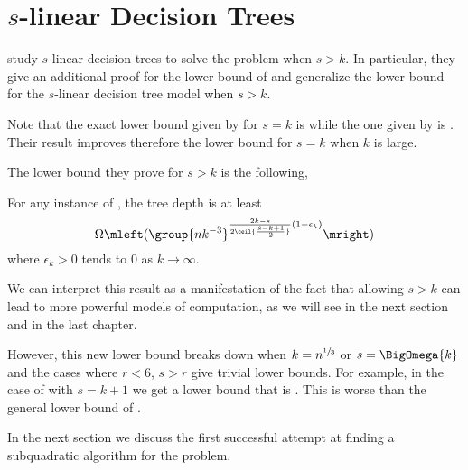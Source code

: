 \section{$s$-linear Decision Trees}

\citet*{ailon:2005} study $s$-linear decision trees to solve the \kSUM
problem when $s > k$. In particular, they give an additional proof for the
 lower bound of \citet{erickson:1999} and
generalize the lower bound for the \(s\)-linear decision tree model when $s > k$.

Note that the exact lower bound given by \citet*{erickson:1999} for \(s = k\) is
 while the one given by
\citet*{ailon:2005} is . Their result
improves therefore the lower bound for \(s = k\) when \(k\) is large.

The lower bound they prove for \(s > k\) is the following,
\begin{theorem}
For any instance of \kLDT, the tree depth is at least
\begin{displaymath}
\Omega\mleft(\group{nk^{-3}}^{\frac{2k-s}{2\ceil{\frac{s-k+1}{2}}}
(1-\epsilon_k) }\mright)
\end{displaymath}
where \(\epsilon_k > 0\) tends to \(0\) as \(k \to\infty\).
\end{theorem}

We can interpret this result as a manifestation of the fact that allowing \(s >
k\) can lead to more powerful models of computation, as we will see in the next
section and in the last chapter.

However, this new lower bound breaks down when
\(k = n^{\sfrac{1}{3}}\) or \(s = \BigOmega{k}\) and the cases where \(r <
6\), \(s > r\) give trivial lower bounds. For example, in the case
of \threeSUM with \(s = k + 1\) we get a lower bound that is . This is
worse than the general lower bound of .

In the next section we discuss the first successful attempt at finding
a subquadratic algorithm for the \threeSUM problem.
